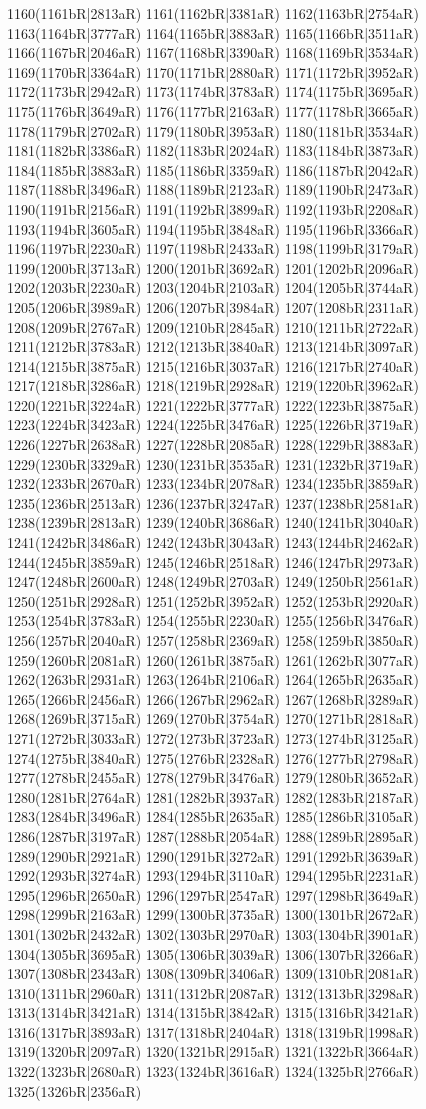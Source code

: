 1160(1161bR|2813aR) 1161(1162bR|3381aR) 1162(1163bR|2754aR) 1163(1164bR|3777aR) 1164(1165bR|3883aR) 1165(1166bR|3511aR) 1166(1167bR|2046aR) 1167(1168bR|3390aR) 1168(1169bR|3534aR) 1169(1170bR|3364aR) 1170(1171bR|2880aR) 1171(1172bR|3952aR) 1172(1173bR|2942aR) 1173(1174bR|3783aR) 1174(1175bR|3695aR) 1175(1176bR|3649aR) 1176(1177bR|2163aR) 1177(1178bR|3665aR) 1178(1179bR|2702aR) 1179(1180bR|3953aR) 1180(1181bR|3534aR) 1181(1182bR|3386aR) 1182(1183bR|2024aR) 1183(1184bR|3873aR) 1184(1185bR|3883aR) 1185(1186bR|3359aR) 1186(1187bR|2042aR) 1187(1188bR|3496aR) 1188(1189bR|2123aR) 1189(1190bR|2473aR) 1190(1191bR|2156aR) 1191(1192bR|3899aR) 1192(1193bR|2208aR) 1193(1194bR|3605aR) 1194(1195bR|3848aR) 1195(1196bR|3366aR) 1196(1197bR|2230aR) 1197(1198bR|2433aR) 1198(1199bR|3179aR) 1199(1200bR|3713aR) 1200(1201bR|3692aR) 1201(1202bR|2096aR) 1202(1203bR|2230aR) 1203(1204bR|2103aR) 1204(1205bR|3744aR) 1205(1206bR|3989aR) 1206(1207bR|3984aR) 1207(1208bR|2311aR) 1208(1209bR|2767aR) 1209(1210bR|2845aR) 1210(1211bR|2722aR) 1211(1212bR|3783aR) 1212(1213bR|3840aR) 1213(1214bR|3097aR) 1214(1215bR|3875aR) 1215(1216bR|3037aR) 1216(1217bR|2740aR) 1217(1218bR|3286aR) 1218(1219bR|2928aR) 1219(1220bR|3962aR) 1220(1221bR|3224aR) 1221(1222bR|3777aR) 1222(1223bR|3875aR) 1223(1224bR|3423aR) 1224(1225bR|3476aR) 1225(1226bR|3719aR) 1226(1227bR|2638aR) 1227(1228bR|2085aR) 1228(1229bR|3883aR) 1229(1230bR|3329aR) 1230(1231bR|3535aR) 1231(1232bR|3719aR) 1232(1233bR|2670aR) 1233(1234bR|2078aR) 1234(1235bR|3859aR) 1235(1236bR|2513aR) 1236(1237bR|3247aR) 1237(1238bR|2581aR) 1238(1239bR|2813aR) 1239(1240bR|3686aR) 1240(1241bR|3040aR) 1241(1242bR|3486aR) 1242(1243bR|3043aR) 1243(1244bR|2462aR) 1244(1245bR|3859aR) 1245(1246bR|2518aR) 1246(1247bR|2973aR) 1247(1248bR|2600aR) 1248(1249bR|2703aR) 1249(1250bR|2561aR) 1250(1251bR|2928aR) 1251(1252bR|3952aR) 1252(1253bR|2920aR) 1253(1254bR|3783aR) 1254(1255bR|2230aR) 1255(1256bR|3476aR) 1256(1257bR|2040aR) 1257(1258bR|2369aR) 1258(1259bR|3850aR) 1259(1260bR|2081aR) 1260(1261bR|3875aR) 1261(1262bR|3077aR) 1262(1263bR|2931aR) 1263(1264bR|2106aR) 1264(1265bR|2635aR) 1265(1266bR|2456aR) 1266(1267bR|2962aR) 1267(1268bR|3289aR) 1268(1269bR|3715aR) 1269(1270bR|3754aR) 1270(1271bR|2818aR) 1271(1272bR|3033aR) 1272(1273bR|3723aR) 1273(1274bR|3125aR) 1274(1275bR|3840aR) 1275(1276bR|2328aR) 1276(1277bR|2798aR) 1277(1278bR|2455aR) 1278(1279bR|3476aR) 1279(1280bR|3652aR) 1280(1281bR|2764aR) 1281(1282bR|3937aR) 1282(1283bR|2187aR) 1283(1284bR|3496aR) 1284(1285bR|2635aR) 1285(1286bR|3105aR) 1286(1287bR|3197aR) 1287(1288bR|2054aR) 1288(1289bR|2895aR) 1289(1290bR|2921aR) 1290(1291bR|3272aR) 1291(1292bR|3639aR) 1292(1293bR|3274aR) 1293(1294bR|3110aR) 1294(1295bR|2231aR) 1295(1296bR|2650aR) 1296(1297bR|2547aR) 1297(1298bR|3649aR) 1298(1299bR|2163aR) 1299(1300bR|3735aR) 1300(1301bR|2672aR) 1301(1302bR|2432aR) 1302(1303bR|2970aR) 1303(1304bR|3901aR) 1304(1305bR|3695aR) 1305(1306bR|3039aR) 1306(1307bR|3266aR) 1307(1308bR|2343aR) 1308(1309bR|3406aR) 1309(1310bR|2081aR) 1310(1311bR|2960aR) 1311(1312bR|2087aR) 1312(1313bR|3298aR) 1313(1314bR|3421aR) 1314(1315bR|3842aR) 1315(1316bR|3421aR) 1316(1317bR|3893aR) 1317(1318bR|2404aR) 1318(1319bR|1998aR) 1319(1320bR|2097aR) 1320(1321bR|2915aR) 1321(1322bR|3664aR) 1322(1323bR|2680aR) 1323(1324bR|3616aR) 1324(1325bR|2766aR) 1325(1326bR|2356aR) 